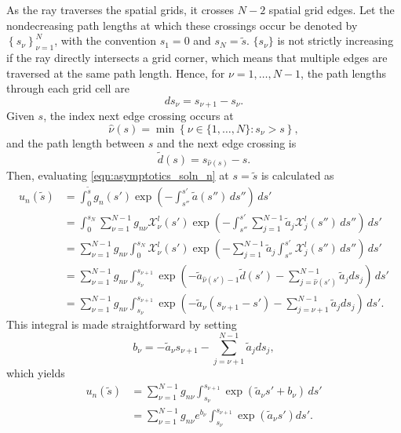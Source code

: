 \documentclass[ms,cpyr,lof,lot]{uathesis}
\begin{document}
As the ray traverses the spatial grids, it crosses $N-2$ spatial grid edges.
Let the nondecreasing path lengths at which these crossings occur be denoted by
$\left\{s_\nu\right\}_{\nu=1}^{N}$, with the convention $s_1=0$ and $s_{N}=\tilde{s}$.
$\{s_\nu\}$ is not strictly increasing if the ray directly intersects a grid corner,
which means that multiple edges are traversed at the same path length.
Hence, for $\nu=1,\ldots,N-1$, the path lengths through each grid cell are
\begin{equation*}
  ds_\nu = s_{\nu+1} - s_\nu.
\end{equation*}
Given $s$, the index next edge crossing occurs at
\begin{equation*}
  \hat{\nu}(s) = \min\left\{ \nu \in \{1,\ldots,N\} : s_\nu>s \right\},
\end{equation*}
and the path length between $s$ and the next edge crossing is
\begin{equation*}
  \tilde{d}(s) = s_{\hat{\nu}(s)}-s.
\end{equation*}
Then, evaluating \eqref{eqn:asymptotics_soln_n} at $s=\tilde{s}$ is calculated as
\begin{align*}
  u_n(\tilde{s}) &= \int_0^{\tilde{s}}g_n(s')\exp\left( -\int_{s''}^{s'}\tilde{a}(s'')\,ds'' \right)\, ds' \\
  &= \int_0^{s_N} \sum_{\nu=1}^{N-1}g_{n\nu}\mathcal{X}^l_\nu(s') \exp\left( -\int_{s''}^{s'}\sum_{j=1}^{N-1}\tilde{a}_{j}\mathcal{X}^l_j(s'')\,ds'' \right)\, ds' \\
  &= \sum_{\nu=1}^{N-1}g_{n\nu}\int_0^{s_N} \mathcal{X}^l_\nu(s') \exp\left( -\sum_{j=1}^{N-1}\tilde{a}_{j}\int_{s''}^{s'}\mathcal{X}^l_j(s'')\,ds'' \right)\, ds' \\
  &= \sum_{\nu=1}^{N-1}g_{n\nu}\int_{s_\nu}^{s_{\nu+1}}  \exp\left(-\tilde{a}_{\hat{\nu}(s')-1}\tilde{d}(s') -\sum_{j=\hat{\nu}(s')}^{N-1}\tilde{a}_{j}ds_j\right)\, ds' \\
  &= \sum_{\nu=1}^{N-1}g_{n\nu}\int_{s_\nu}^{s_{\nu+1}}  \exp\left(-\tilde{a}_{\nu}(s_{\nu+1}-s') -\sum_{j=\nu+1}^{N-1}\tilde{a}_{j}ds_j\right)\, ds'.
\end{align*}
This integral is made straightforward by setting
\begin{equation*}
  b_\nu = -\tilde{a}_{\nu}s_{\nu+1} - \sum_{j=\nu+1}^{N-1}\tilde{a}_{j}ds_j,
\end{equation*}
which yields
\begin{align*}
  u_n(\tilde{s}) &= \sum_{\nu=1}^{N-1}g_{n\nu}\int_{s_\nu}^{s_{\nu+1}}  \exp\left(\tilde{a}_{\nu}s' + b_\nu\right)\, ds' \\
                 &= \sum_{\nu=1}^{N-1}g_{n\nu}e^{b_\nu}\int_{s_\nu}^{s_{\nu+1}}  \exp\left(\tilde{a}_{\nu}s'\right) ds'.
\end{align*}
\end{document}
